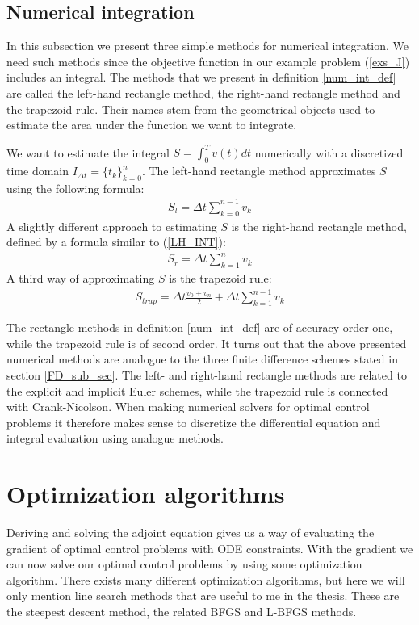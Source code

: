 \subsection{Numerical integration} \label{num_int_sub_sec}
In this subsection we present three simple methods for numerical integration. We need such methods since the objective function in our example problem (\ref{exs_J}) includes an integral. The methods that we present in definition \ref{num_int_def} are called the left-hand rectangle method, the right-hand rectangle method and the trapezoid rule. Their names stem from the geometrical objects used to estimate the area under the function we want to integrate.
\begin{definition} \label{num_int_def}
We want to estimate the integral $S=\int_0^T v(t) dt$ numerically with a discretized time domain $I_{\Delta t}=\{t_k\}_{k=0}^{n}$. The left-hand rectangle method approximates $S$ using the following formula:
\begin{align}
S_l = \Delta t\sum_{k=0}^{n-1} v_k \label{LH_INT}
\end{align}
A slightly different approach to estimating $S$ is the right-hand rectangle method, defined by a formula similar to (\ref{LH_INT}): 
\begin{align}
S_r = \Delta t\sum_{k=1}^{n} v_k \label{RH_INT}
\end{align}
A third way of approximating $S$ is the trapezoid rule:
\begin{align}
S_{trap} = \Delta t\frac{v_0+v_n}{2}+\Delta t\sum_{k=1}^{n-1} v_k \label{TRAP_INT}
\end{align}
\end{definition}
\noindent
The rectangle methods in definition \ref{num_int_def} are of accuracy order one, while the trapezoid rule is of second order. It turns out that the above presented numerical methods are analogue to the three finite difference schemes stated in section \ref{FD_sub_sec}. The left- and right-hand rectangle methods are related to the explicit and implicit Euler schemes, while the trapezoid rule is connected with Crank-Nicolson. When making numerical solvers for optimal control problems it therefore makes sense to discretize the differential equation and integral evaluation using analogue methods. 
\section{Optimization algorithms}
Deriving and solving the adjoint equation gives us a way of evaluating the gradient of optimal control problems with ODE constraints. With the gradient we can now solve our optimal control problems by using some optimization algorithm. There exists many different optimization algorithms, but here we will only mention line search methods that are useful to me in the thesis. These are the steepest descent method, the related BFGS and L-BFGS methods.  
